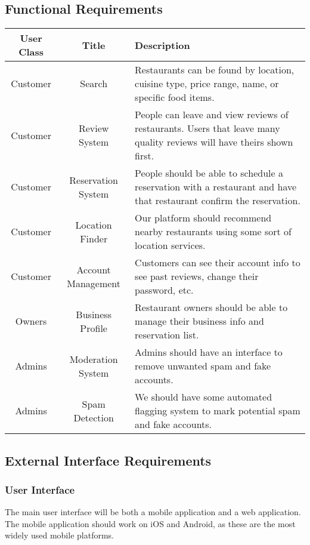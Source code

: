 \documentclass[12pt]{article}
\begin{document}
\subsection{Functional Requirements}

\begin{center}
    \begin{tabularx}{\linewidth}{c|c|X}
        User Class & Title & Description\\
        \hline
        \hline
        Customer & Search & Restaurants can be found by location, cuisine type, price range, name, or specific food items.\\
        \hline
        Customer & Review System & People can leave and view reviews of restaurants. Users that leave many quality reviews will have theirs shown first.\\
        \hline
        Customer & Reservation System & People should be able to schedule a reservation with a restaurant and have that restaurant confirm the reservation.\\
        \hline
        Customer & Location Finder & Our platform should recommend nearby restaurants using some sort of location services.\\
        \hline
        Customer & Account Management & Customers can see their account info to see past reviews, change their password, etc.\\
        \hline
        Owners & Business Profile & Restaurant owners should be able to manage their business info and reservation list.\\
        \hline
        Admins & Moderation System & Admins should have an interface to remove unwanted spam and fake accounts.\\
        \hline
        Admins & Spam Detection & We should have some automated flagging system to mark potential spam and fake accounts.
    \end{tabularx}
\end{center}

\subsection{External Interface Requirements}

\subsubsection{User Interface}

The main user interface will be both a mobile application and a web application. The mobile application should work on iOS
and Android, as these are the most widely used mobile platforms.
\end{document}
